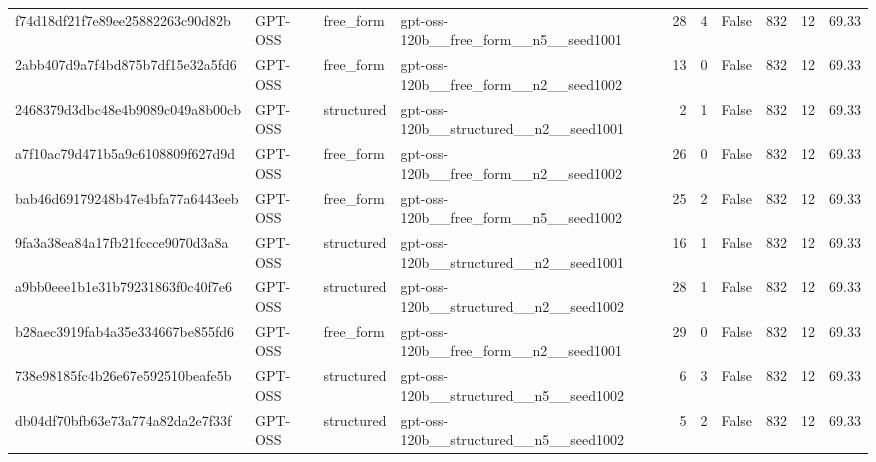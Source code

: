 \begin{longtable}{llllrrrrrr}
f74d18df21f7e89ee25882263c90d82b & GPT-OSS & free\_form & gpt-oss-120b\_\_free\_form\_\_n5\_\_seed1001 & 28 & 4 & False & 832 & 12 & 69.33 \\
2abb407d9a7f4bd875b7df15e32a5fd6 & GPT-OSS & free\_form & gpt-oss-120b\_\_free\_form\_\_n2\_\_seed1002 & 13 & 0 & False & 832 & 12 & 69.33 \\
2468379d3dbc48e4b9089c049a8b00cb & GPT-OSS & structured & gpt-oss-120b\_\_structured\_\_n2\_\_seed1001 & 2 & 1 & False & 832 & 12 & 69.33 \\
a7f10ac79d471b5a9c6108809f627d9d & GPT-OSS & free\_form & gpt-oss-120b\_\_free\_form\_\_n2\_\_seed1002 & 26 & 0 & False & 832 & 12 & 69.33 \\
bab46d69179248b47e4bfa77a6443eeb & GPT-OSS & free\_form & gpt-oss-120b\_\_free\_form\_\_n5\_\_seed1002 & 25 & 2 & False & 832 & 12 & 69.33 \\
9fa3a38ea84a17fb21fccce9070d3a8a & GPT-OSS & structured & gpt-oss-120b\_\_structured\_\_n2\_\_seed1001 & 16 & 1 & False & 832 & 12 & 69.33 \\
a9bb0eee1b1e31b79231863f0c40f7e6 & GPT-OSS & structured & gpt-oss-120b\_\_structured\_\_n2\_\_seed1002 & 28 & 1 & False & 832 & 12 & 69.33 \\
b28aec3919fab4a35e334667be855fd6 & GPT-OSS & free\_form & gpt-oss-120b\_\_free\_form\_\_n2\_\_seed1001 & 29 & 0 & False & 832 & 12 & 69.33 \\
738e98185fc4b26e67e592510beafe5b & GPT-OSS & structured & gpt-oss-120b\_\_structured\_\_n5\_\_seed1002 & 6 & 3 & False & 832 & 12 & 69.33 \\
db04df70bfb63e73a774a82da2e7f33f & GPT-OSS & structured & gpt-oss-120b\_\_structured\_\_n5\_\_seed1002 & 5 & 2 & False & 832 & 12 & 69.33 \\
\end{longtable}
